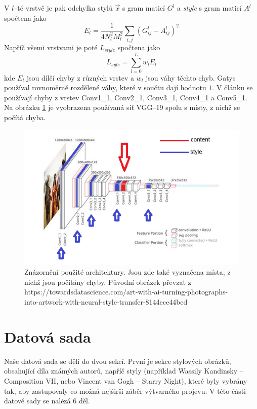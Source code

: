 \documentclass[twocolumn]{article}
\begin{document}
	V $l$--té vrstvě je pak odchylka stylů $\overrightarrow{x}$ s gram maticí $G^l$ a \textit{style} s gram maticí $A^l$ spočtena jako
	\begin{equation*}
		E_l = \frac{1}{4N_l^2M^2_l} \sum_{i,j}(G_{ij}^l - A_{ij}^l)^2
	\end{equation*}
	Napříč všemi vrstvami je poté $L_{style}$ spočtena jako
		\begin{equation*}
		L_{syle} = \sum_{l=0}^{L} w_l E_l
	\end{equation*}
	kde $E_l$ jsou dílčí chyby z různých vrstev a $w_l$ jsou váhy těchto chyb. Gatys používal rovnoměrně rozdělené váhy, které v součtu dají hodnotu $1$. V článku se používají chyby z vrstev Conv1\_1, Conv2\_1, Conv3\_1, Conv4\_1 a Conv5\_1.
	\\
	Na obrázku \ref{VGG} je vyobrazena používaná síť VGG--19 spolu s místy, z nichž se počítá chyba.
	\begin{figure}[h]
	\includegraphics[width=\linewidth]{VGG.png}
	\caption{Znázornění použité architektury. Jsou zde také vyznačena místa, z nichž jsou počítány chyby. Původní obrázek převzat z https://towardsdatascience.com/art-with-ai-turning-photographs-into-artwork-with-neural-style-transfer-8144ece44bed}
	\label{VGG}
\end{figure}
	
\section*{Datová sada}
	Naše datová sada se dělí do dvou sekcí. První je sekce stylových obrázků, obsahující díla známých autorů, napříč styly (například Wassily Kandinsky -- Composition VII, nebo Vincent van Gogh -- Starry Night), které byly vybrány tak, aby zastupovaly co možná nejširší záběr výtvarného projevu. V této části datové sady se nalézá 6 děl. 
	\par
	
\end{document}
